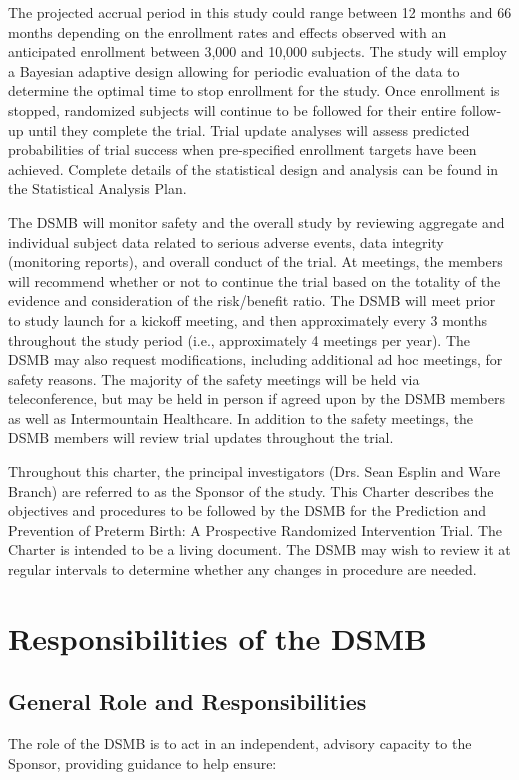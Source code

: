\documentclass[12pt]{article}
\begin{document}
The projected accrual period in this study could range between 12 months and 
66 months depending on the enrollment rates and effects observed with an 
anticipated enrollment between 3,000 and 10,000 subjects. The study will 
employ a Bayesian adaptive design allowing for periodic evaluation of the 
data to determine the optimal time to stop enrollment for the study.  Once 
enrollment is stopped, randomized subjects will continue to be followed for 
their entire follow-up until they complete the trial. Trial update analyses 
will assess predicted probabilities of trial success when pre-specified 
enrollment targets have been achieved.  Complete details of the statistical 
design and analysis can be found in the Statistical Analysis Plan.  

The DSMB will monitor safety and the overall study by reviewing aggregate 
and individual subject data related to serious adverse events, data 
integrity (monitoring reports), and overall conduct of the trial.  At 
meetings, the members will recommend whether or not to continue the trial 
based on the totality of the evidence and consideration of the risk/benefit 
ratio.  The DSMB will meet prior to study launch for a kickoff meeting, and 
then approximately every 3 months throughout the study period (i.e., 
approximately 4 meetings per year). The DSMB may also request modifications, 
including additional ad hoc meetings, for safety reasons. The majority of 
the safety meetings will be held via teleconference, but may be held in 
person if agreed upon by the DSMB members as well as Intermountain 
Healthcare. In addition to the safety meetings, the DSMB members will review 
trial updates throughout the trial. 

Throughout this charter, the principal investigators (Drs. Sean Esplin and 
Ware Branch) are referred to as the Sponsor of the study. This Charter 
describes the objectives and procedures to be followed by the DSMB for the 
Prediction and Prevention of Preterm Birth: A Prospective Randomized 
Intervention Trial. The Charter is intended to be a living document. The 
DSMB may wish to review it at regular intervals to determine whether any 
changes in procedure are needed.  


\section{Responsibilities of the DSMB}


\subsection{General Role and Responsibilities}
The role of the DSMB is to act in an independent, advisory capacity to the 
Sponsor, providing guidance to help ensure:
\end{document}

